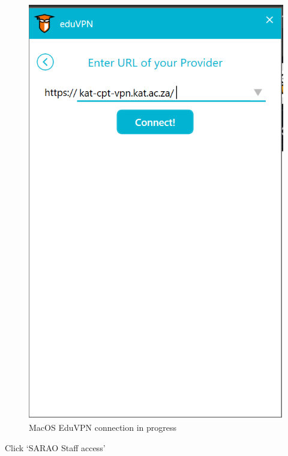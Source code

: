 \begin{figure}[!thb]
	\centering
	\includegraphics[scale=0.3]{Chapters/images/image69.png}
	
	\caption{MacOS EduVPN connection in progress }
	\label{fig:image69}
\end{figure}
Click ‘SARAO Staff access’
